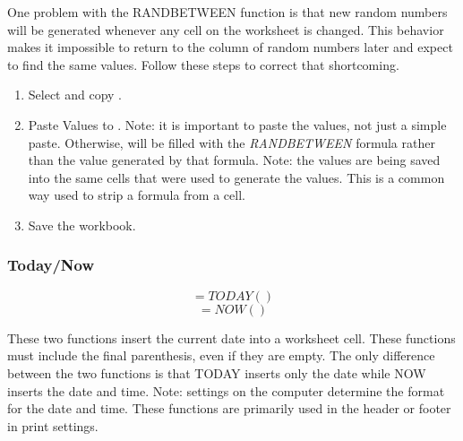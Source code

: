 One problem with the RANDBETWEEN function is that new random numbers will be generated whenever any cell on the worksheet is changed. This behavior makes it impossible to return to the column of random numbers later and expect to find the same values. Follow these steps to correct that shortcoming.

\begin{enumbox}
	\begin{enumerate}
		\item Select and copy .
		\item Paste Values to . Note: it is important to paste the values, not just a simple paste. Otherwise,  will be filled with the \textit{RANDBETWEEN} formula rather than the value generated by that formula. Note: the values are being saved into the same cells that were used to generate the values. This is a common way used to strip a formula from a cell.
		\item Save the  workbook.
	\end{enumerate}
\end{enumbox}
	
\subsubsection{Today/Now}

\[ =TODAY() \]
\[ =NOW() \]

These two functions insert the current date into a worksheet cell. These functions must include the final parenthesis, even if they are empty. The only difference between the two functions is that TODAY inserts only the date while NOW inserts the date and time. Note: settings on the computer determine the format for the date and time. These functions are primarily used in the header or footer in print settings.

